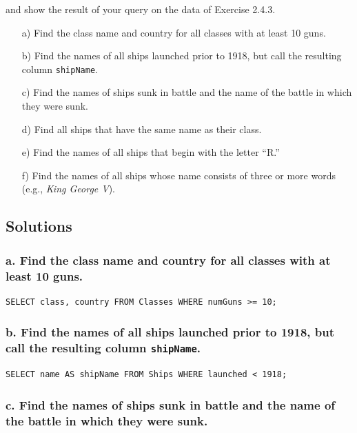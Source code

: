\documentclass{cshwk}
\begin{document}
and show the result of your query on the data of Exercise 2.4.3.

\begin{enumerate}
    \item[a)] Find the class name and country for all classes with at least 10 guns.
    \item[b)] Find the names of all ships launched prior to 1918, but call the resulting column \texttt{shipName}.
    \item[c)] Find the names of ships sunk in battle and the name of the battle in which they were sunk.
    \item[d)] Find all ships that have the same name as their class.
    \item[e)] Find the names of all ships that begin with the letter ``R.''
    \item[f)] Find the names of all ships whose name consists of three or more words (e.g., \textit{King George V}).
\end{enumerate}

\subsection{Solutions}

\subsubsection*{a. Find the class name and country for all classes with at least 10 guns.}

\begin{lstlisting}
SELECT class, country FROM Classes WHERE numGuns >= 10;
\end{lstlisting}

\subsubsection*{b. Find the names of all ships launched prior to 1918, but call the resulting column \texttt{shipName}.}

\begin{lstlisting}
SELECT name AS shipName FROM Ships WHERE launched < 1918;
\end{lstlisting}

\subsubsection*{c. Find the names of ships sunk in battle and the name of the battle in which they were sunk.}
\end{document}
